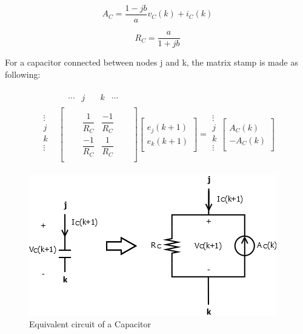 \begin{equation} \label{eq:AC}
	A_C = \frac{1-jb}{a} v_C(k) + i_C(k)
\end{equation}

\begin{equation}
	R_C = \frac{a}{1+jb}
\end{equation}

For a capacitor connected between nodes j and k, the matrix stamp is made as following:

\begin{align}
\begin{split}
&
\begin{matrix}
& \cdots & j & \quad k & \cdots
\end{matrix}\\[-6pt]
\begin{matrix}
\vdots\\[6pt]
j\\[6pt]
k\\[6pt]
\vdots\\
\end{matrix}
&
\begin{bmatrix}
	\quad & \quad &  \\[6pt]
	\quad & \dfrac{1}{R_C} & \dfrac{-1}{R_C} & \quad  \\[6pt]
	\quad & \dfrac{-1}{R_C} & \dfrac{1}{R_C} & \quad \\[6pt]
	\quad &  & 
\end{bmatrix}
\begin{bmatrix}
	\quad \\[6pt]
	e_j(k+1)\\[6pt]
	e_k(k+1)\\[6pt]
	\quad
\end{bmatrix}
=
\begin{matrix}
\vdots\\[6pt]
j\\[6pt]
k\\[6pt]
\vdots\\
\end{matrix}
\begin{bmatrix}
	\quad \\[6pt]
	A_C(k)\\[6pt]
	-A_C(k)\\[6pt]
	\quad
\end{bmatrix}
\end{split}
\end{align}

\begin{figure}[ht]
	\centering
	\includegraphics[scale=0.6]{img/Capacitor.png} 
	\caption{Equivalent circuit of a Capacitor}
	\label{fig:Capacitor}
\end{figure}



